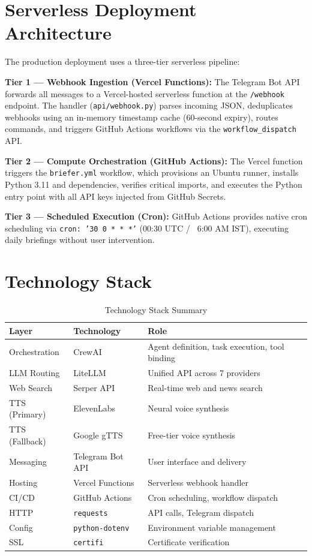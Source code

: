 \documentclass[12pt,a4paper]{report}
\begin{document}
\section{Serverless Deployment Architecture}
The production deployment uses a three-tier serverless pipeline:

\textbf{Tier 1 --- Webhook Ingestion (Vercel Functions):} The Telegram Bot API forwards all messages to a Vercel-hosted serverless function at the \texttt{/webhook} endpoint. The handler (\texttt{api/webhook.py}) parses incoming JSON, deduplicates webhooks using an in-memory timestamp cache (60-second expiry), routes commands, and triggers GitHub Actions workflows via the \texttt{workflow\_dispatch} API.

\textbf{Tier 2 --- Compute Orchestration (GitHub Actions):} The Vercel function triggers the \texttt{briefer.yml} workflow, which provisions an Ubuntu runner, installs Python 3.11 and dependencies, verifies critical imports, and executes the Python entry point with all API keys injected from GitHub Secrets.

\textbf{Tier 3 --- Scheduled Execution (Cron):} GitHub Actions provides native cron scheduling via \texttt{cron: '30 0 * * *'} (00:30 UTC / ~6:00 AM IST), executing daily briefings without user intervention.

\section{Technology Stack}

\begin{table}[htbp]
\caption{Technology Stack Summary}
\centering
\begin{tabular}{@{}llp{5cm}@{}}
\toprule
\textbf{Layer} & \textbf{Technology} & \textbf{Role} \\
\midrule
Orchestration & CrewAI & Agent definition, task execution, tool binding \\
LLM Routing & LiteLLM & Unified API across 7 providers \\
Web Search & Serper API & Real-time web and news search \\
TTS (Primary) & ElevenLabs & Neural voice synthesis \\
TTS (Fallback) & Google gTTS & Free-tier voice synthesis \\
Messaging & Telegram Bot API & User interface and delivery \\
Hosting & Vercel Functions & Serverless webhook handler \\
CI/CD & GitHub Actions & Cron scheduling, workflow dispatch \\
HTTP & \texttt{requests} & API calls, Telegram dispatch \\
Config & \texttt{python-dotenv} & Environment variable management \\
SSL & \texttt{certifi} & Certificate verification \\
\bottomrule
\end{tabular}
\end{table}
\end{document}
